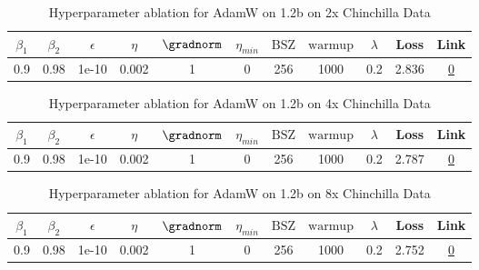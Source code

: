 \begin{table}[H]
\centering
\caption{Hyperparameter ablation for AdamW on 1.2b on 2x Chinchilla Data}
\label{tab:ablation_adamw_1.2b_on_2x_chinchilla_data}
\begin{tabular}{ccccccccccc}
\toprule
$\beta_1$ & $\beta_2$ & $\epsilon$ & $\eta$ & $\gradnorm$ & $\eta_{min}$ & $\mathrm{BSZ}$ & $\mathrm{warmup}$ & $\lambda$ & Loss & Link \\
\midrule
0.9 & 0.98 & 1e-10 & 0.002 & 1 & 0 & 256 & 1000 & 0.2 & 2.836 & \href{https://wandb.ai/stanford-mercury/optimizer-scaling/runs/sweep-1.2b-48B-adamw7ebb9alr0.002-wd0.2-minlr0.0-warmup1000-b10.-994f23}{0} \\
\midrule
\bottomrule
\end{tabular}
\end{table}

\begin{table}[H]
\centering
\caption{Hyperparameter ablation for AdamW on 1.2b on 4x Chinchilla Data}
\label{tab:ablation_adamw_1.2b_on_4x_chinchilla_data}
\begin{tabular}{ccccccccccc}
\toprule
$\beta_1$ & $\beta_2$ & $\epsilon$ & $\eta$ & $\gradnorm$ & $\eta_{min}$ & $\mathrm{BSZ}$ & $\mathrm{warmup}$ & $\lambda$ & Loss & Link \\
\midrule
0.9 & 0.98 & 1e-10 & 0.002 & 1 & 0 & 256 & 1000 & 0.2 & 2.787 & \href{https://wandb.ai/stanford-mercury/optimizer-scaling/runs/sweep-1.2b-96B-adamw71c224lr0.002-wd0.2-minlr0.0-warmup1000-b10.-66682a}{0} \\
\midrule
\bottomrule
\end{tabular}
\end{table}

\begin{table}[H]
\centering
\caption{Hyperparameter ablation for AdamW on 1.2b on 8x Chinchilla Data}
\label{tab:ablation_adamw_1.2b_on_8x_chinchilla_data}
\begin{tabular}{ccccccccccc}
\toprule
$\beta_1$ & $\beta_2$ & $\epsilon$ & $\eta$ & $\gradnorm$ & $\eta_{min}$ & $\mathrm{BSZ}$ & $\mathrm{warmup}$ & $\lambda$ & Loss & Link \\
\midrule
0.9 & 0.98 & 1e-10 & 0.002 & 1 & 0 & 256 & 1000 & 0.2 & 2.752 & \href{https://wandb.ai/stanford-mercury/optimizer-scaling/runs/sweep-1.2b-193B-adamw1eeba1lr0.002-wd0.2-minlr0.0-warmup1000-b10-44a428}{0} \\
\midrule
\bottomrule
\end{tabular}
\end{table}

